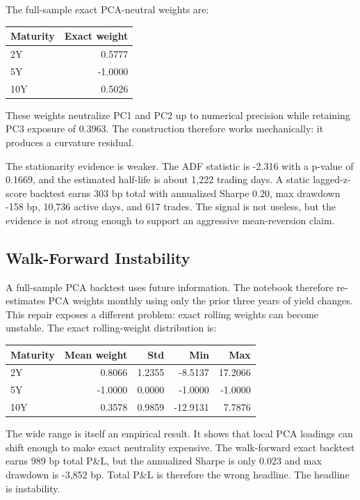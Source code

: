 \documentclass[12pt]{article}
\begin{document}
The full-sample exact PCA-neutral weights are:

\begin{center}
\begin{tabular}{lr}
\toprule
Maturity & Exact weight \\
\midrule
2Y & 0.5777 \\
5Y & -1.0000 \\
10Y & 0.5026 \\
\bottomrule
\end{tabular}
\end{center}

These weights neutralize PC1 and PC2 up to numerical precision while retaining PC3 exposure of
0.3963. The construction therefore works mechanically: it produces a curvature residual.

The stationarity evidence is weaker. The ADF statistic is -2.316 with a p-value of 0.1669, and the
estimated half-life is about 1,222 trading days. A static lagged-z-score backtest earns 303 bp total
with annualized Sharpe 0.20, max drawdown -158 bp, 10,736 active days, and 617 trades. The
signal is not useless, but the evidence is not strong enough to support an aggressive
mean-reversion claim.

\subsection{Walk-Forward Instability}

A full-sample PCA backtest uses future information. The notebook therefore re-estimates PCA
weights monthly using only the prior three years of yield changes. This repair exposes a different
problem: exact rolling weights can become unstable. The exact rolling-weight distribution is:

\begin{center}
\begin{tabular}{lrrrr}
\toprule
Maturity & Mean weight & Std & Min & Max \\
\midrule
2Y & 0.8066 & 1.2355 & -8.5137 & 17.2066 \\
5Y & -1.0000 & 0.0000 & -1.0000 & -1.0000 \\
10Y & 0.3578 & 0.9859 & -12.9131 & 7.7876 \\
\bottomrule
\end{tabular}
\end{center}

The wide range is itself an empirical result. It shows that local PCA loadings can shift enough to
make exact neutrality expensive. The walk-forward exact backtest earns 989 bp total P\&L, but
the annualized Sharpe is only 0.023 and max drawdown is -3,852 bp. Total P\&L is therefore the
wrong headline. The headline is instability.
\end{document}
